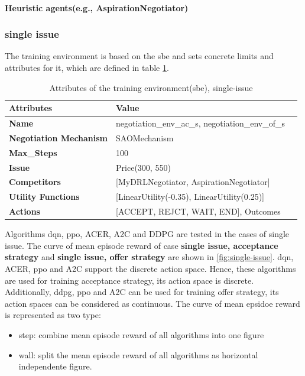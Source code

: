 \paragraph{Heuristic agents(e.g., AspirationNegotiator)}

\subsubsection{single issue}
The training environment is based on the \gls{sbe} and sets concrete limits and attributes for it, which are defined in table \ref{tab:attributes-sbe}.

\begin{table}[htbp]
\centering
\begin{tabular}{l l l} \toprule
\bfseries \textbf{Attributes}      & \bfseries \textbf{Value}             \\ \midrule
\textbf{Name}                    & negotiation\_env\_ac\_s, negotiation\_env\_of\_s \\
\textbf{Negotiation Mechanism}   & SAOMechanism                                        \\
\textbf{Max\_Steps}              & 100                                                 \\
\textbf{Issue}             	     & Price(300, 550)                                     \\
\textbf{Competitors}             & [MyDRLNegotiator, AspirationNegotiator]             \\
\textbf{Utility Functions}       & [LinearUtility(-0.35), LinearUtility(0.25)]         \\
\textbf{Actions}                 & [ACCEPT, REJCT, WAIT, END], Outcomes\\
\bottomrule
\end{tabular}
\caption{Attributes of the training environment(sbe), single-issue}
\label{tab:attributes-sbe}
\end{table}

Algorithms \gls{dqn}, \gls{ppo}, ACER\parencite{DBLP:journals/corr/WangBHMMKF16}, A2C and DDPG are tested in the cases of single issue. The curve of mean episode reward of case  \textbf{single issue, acceptance strategy} and \textbf{single issue, offer strategy} are shown in \ref{fig:single-issue}. \gls{dqn}, ACER, \gls{ppo} and A2C support the discrete action space. Hence, these algorithms are used for training acceptance strategy, its action space is discrete. Additionally, \gls{ddpg}, \gls{ppo} and A2C can be used for training offer strategy, its action spaces can be considered as continuous. The curve of mean epsidoe reward is represented as two type: 
\begin{itemize}
\item step: combine mean episode reward of all algorithms into one figure
\item wall: split the mean episode reward of all algorithms as horizontal independente figure.
\end{itemize}


